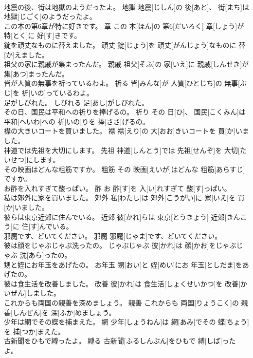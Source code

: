 \documentclass[8pt]{extreport}
\begin{document}
\begin{CJK}{UTF8}{min}
\\	地震の後、街は地獄のようだったよ。	地獄	地震[じしん]の 後[あと]、 街[まち]は 地獄[じごく]のようだったよ。	
\\	この本の第6章が特に好きです。	章	この 本[ほん]の 第6[だいろく] 章[しょう]が 特[とく]に 好[す]きです。	
\\	錠を頑丈なものに替えました。	頑丈	錠[じょう]を 頑丈[がんじょう]なものに 替[か]えました。	
\\	祖父の家に親戚が集まったんだ。	親戚	祖父[そふ]の 家[いえ]に 親戚[しんせき]が 集[あつ]まったんだ。	
\\	皆が人質の無事を祈っているわよ。	祈る	皆[みんな]が 人質[ひとじち]の 無事[ぶじ]を 祈[いの]っているわよ。	
\\	足がしびれた。	しびれる	足[あし]がしびれた。	
\\	その日、国民は平和への祈りを捧げるの。	祈り	その 日[ひ]、 国民[こくみん]は 平和[へいわ]への 祈[いの]りを 捧[ささ]げるの。	
\\	襟の大きいコートを買いました。	襟	襟[えり]の 大[おお]きいコートを 買[か]いました。	
\\	神道では先祖を大切にします。	先祖	神道[しんとう]では 先祖[せんぞ]を 大切[たいせつ]にします。	
\\	その映画はどんな粗筋ですか。	粗筋	その 映画[えいが]はどんな 粗筋[あらすじ]ですか。	
\\	お酢を入れすぎて酸っぱい。	酢	お 酢[す]を 入[い]れすぎて 酸[す]っぱい。	
\\	私は郊外に家を買いました。	郊外	私[わたし]は 郊外[こうがい]に 家[いえ]を 買[か]いました。	
\\	彼らは東京近郊に住んでいる。	近郊	彼[かれ]らは 東京[とうきょう] 近郊[きんこう]に 住[す]んでいる。	
\\	邪魔です、どいてください。	邪魔	邪魔[じゃま]です、どいてください。	
\\	彼は顔をじゃぶじゃぶ洗ったの。	じゃぶじゃぶ	彼[かれ]は 顔[かお]をじゃぶじゃぶ 洗[あら]ったの。	
\\	甥と姪にお年玉をあげたの。	お年玉	甥[おい]と 姪[めい]にお 年玉[としだま]をあげたの。	
\\	彼は食生活を改善しました。	改善	彼[かれ]は 食生活[しょくせいかつ]を 改善[かいぜん]しました。	
\\	これからも両国の親善を深めましょう。	親善	これからも 両国[りょうこく]の 親善[しんぜん]を 深[ふか]めましょう。	
\\	少年は網でその蝶を捕まえた。	網	少年[しょうねん]は 網[あみ]でその 蝶[ちょう]を 捕[つか]まえた。	
\\	古新聞をひもで縛ったよ。	縛る	古新聞[ふるしんぶん]をひもで 縛[しば]ったよ。	

\end{CJK}
\end{document}
